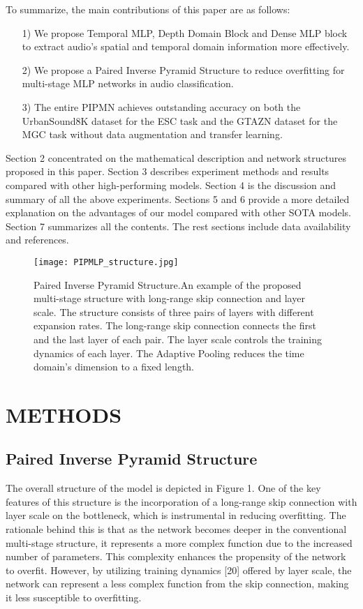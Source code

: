 \documentclass[runningheads]{llncs}
\begin{document}
  To summarize, the main contributions of this paper are as follows:
\begin{itemize}
  \item [1)]
  We propose  Temporal MLP, Depth Domain Block  and Dense MLP block to extract audio's spatial and temporal domain information more effectively.
  \item [2)]
  We propose a Paired Inverse Pyramid Structure to reduce overfitting for multi-stage MLP networks in audio classification.
  \item [3)]
  The entire PIPMN achieves outstanding accuracy on both the UrbanSound8K dataset for the ESC task and the GTAZN dataset for the MGC task without data augmentation and transfer learning.
\end{itemize}

  Section 2 concentrated on the mathematical description and network structures proposed in this paper. Section 3 describes experiment methods and results compared with other high-performing models. Section 4 is the discussion and summary of all the above experiments. Sections 5 and 6 provide a more detailed explanation on the advantages of our model compared with other SOTA models. Section 7 summarizes all the contents. The rest sections include data availability and references.

\begin{figure}
\centering
\texttt{[image: PIPMLP\_structure.jpg]}
\caption{Paired Inverse Pyramid Structure.An example of the proposed multi-stage structure with long-range skip connection and layer scale. The structure consists of three pairs of layers with different expansion rates. The long-range skip connection connects the first and the last layer of each pair. The layer scale controls the training dynamics of each layer. The Adaptive Pooling reduces the time domain’s dimension to a fixed length.} \label{fig1}
\end{figure}

\section{METHODS}
\label{sec:format}

\subsection{Paired Inverse Pyramid Structure}

The overall structure of the model is depicted in Figure 1. One of the key features of this structure is the incorporation of a long-range skip connection with layer scale on the bottleneck, which is instrumental in reducing overfitting. The rationale behind this is that as the network becomes deeper in the conventional multi-stage structure, it represents a more complex function due to the increased number of parameters. This complexity enhances the propensity of the network to overfit. However, by utilizing training dynamics [20] offered by layer scale, the network can represent a less complex function from the skip connection, making it less susceptible to overfitting.
\end{document}
